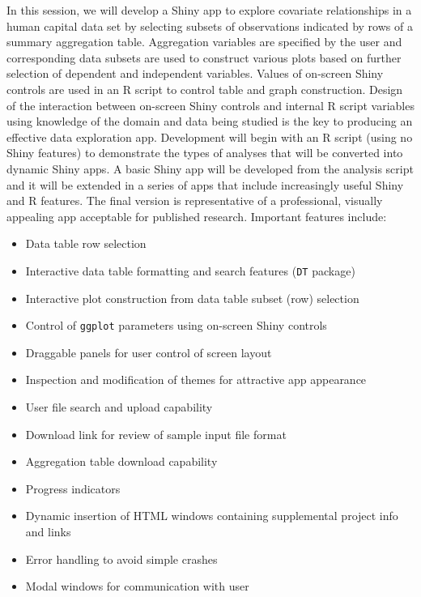 \documentclass[10pt, letterpaper]{article}
\begin{document}
\begin{spacing}{1.0}
In this session, we will develop a Shiny app to explore covariate relationships in a human capital data set by selecting subsets of observations indicated by rows of a summary aggregation table.  Aggregation variables are specified by the user and corresponding data subsets are used to construct various plots based on further selection of dependent and independent variables.  Values of on-screen Shiny controls are used in an R script to control table and graph construction.  Design of the interaction between on-screen Shiny controls and internal R script variables using knowledge of the domain and data being studied is the key to producing an effective data exploration app.  Development will begin with an R script (using no Shiny features) to demonstrate the types of analyses that will be converted into dynamic Shiny apps.  A basic Shiny app will be developed from the analysis script and it will be extended in a series of apps that include increasingly useful Shiny and R features.  The final version is representative of a professional, visually appealing app acceptable for published research.  Important features include:

\begin{itemize}[noitemsep]
    \item Data table row selection
    \item Interactive data table formatting and search features (\texttt{DT} package)
    \item Interactive plot construction from data table subset (row) selection
    \item Control of \texttt{ggplot} parameters using on-screen Shiny controls
    \item Draggable panels for user control of screen layout
    \item Inspection and modification of themes for attractive app appearance 
    \item User file search and upload capability
    \item Download link for review of sample input file format
    \item Aggregation table download capability
    \item Progress indicators
    \item Dynamic insertion of HTML windows containing supplemental project info and links
    \item Error handling to avoid simple crashes
    \item Modal windows for communication with user
\end{itemize}


\end{spacing}
\end{document}
